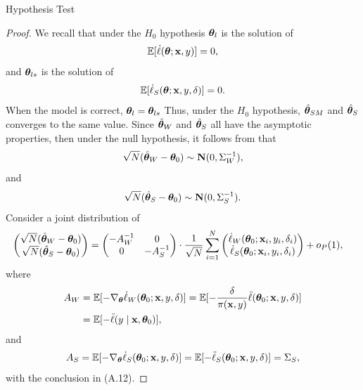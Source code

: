 \documentclass[12pt,hidelinks]{article}
\begin{document}
\begin{section}{Hypothesis Test}
\begin{proof}
We recall that under the $H_0$ hypothesis $\bm{\theta}_l$ is the solution of
\begin{equation*}
     \mathbb{E} [\dot \ell (\bm{\theta}; \mathbf{x},y)]= 0,
\end{equation*}
and $\bm{\theta}_{ls}$ is the solution of 
\begin{equation*}
    \mathbb{E} [\dot \ell_S(\bm{\theta}; \mathbf{x}, y, \delta) ] =0.
\end{equation*}
When the model is correct, $\bm{\theta}_l = \bm{\theta}_{ls}$
Thus, under the $H_0$ hypothesis, ${\hat{\bm{\theta}}}_{SM}$ and ${\hat{\bm{\theta}}}_{S}$ converges to the same value.
Since ${\hat{\bm{\theta}}}_W$ and ${\hat{\bm{\theta}}}_S$ all have the asymptotic properties, then under the null hypothesis, it follows from \cite{liu2016inverse, wang2022maximum} that
\begin{equation*}
   \sqrt{N} ({\hat{\bm{\theta}}}_W - \bm{\theta}_0) \sim \mathbf{N}(0, \Sigma_W^{-1}),
\end{equation*} 
and 
\begin{equation*}
   \sqrt{N} ({\hat{\bm{\theta}}}_S - \bm{\theta}_0) \sim \mathbf{N}(0, \Sigma_S^{-1}).
\end{equation*}
Consider a joint distribution of
\begin{align}
    \begin{pmatrix}
  \sqrt{N}({\hat{\bm{\theta}}}_W - \bm{\theta}_0) \\
\sqrt{N}({\hat{\bm{\theta}}}_S - \bm{\theta}_0)
\end{pmatrix} & = 
\begin{pmatrix}
    -A_W^{-1} & 0 \\
    0 & -A_S^{-1}
\end{pmatrix}
\cdot \frac{1}{\sqrt{N}} \sum_{i=1}^{N} 
\begin{pmatrix}
    \dot \ell_W(\bm{\theta}_0; \mathbf{x}_i, y_i, \delta_i) \\
    \dot \ell_S(\bm{\theta}_0; \mathbf{x}_i, y_i, \delta_i) 
\end{pmatrix} + o_{P}(1),
\end{align}
where 
\begin{align}\label{eq:AW}
    A_W &= \mathbb{E} [- \nabla_{\bm{\theta}} \dot \ell_W (\bm{\theta}_0; \mathbf{x}, y, \delta)] = \mathbb{E} [- \frac{\delta}{\pi(\mathbf{x}, y)} \ddot \ell(\bm{\theta}_0; \mathbf{x}, y, \delta)] \notag \\
    &= \mathbb{E} [-\ddot \ell (y \mid \mathbf{x}, \bm{\theta}_0)] ,
\end{align} 
and
\begin{align}
    A_S  = \mathbb{E} [-\nabla_{\bm{\theta}} \dot \ell_S(\bm{\theta}_0; \mathbf{x}, y, \delta)] = \mathbb{E} [-\ddot \ell_S(\bm{\theta}_0; \mathbf{x}, y, \delta)] = \Sigma_S,
\end{align}
with the conclusion in \cite{wang2022maximum} (A.12).


\end{proof}
\end{section}
\end{document}
